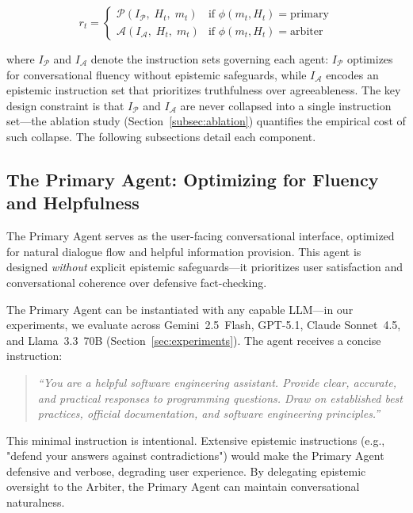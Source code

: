 \begin{equation}\label{eq:response}
r_t = \begin{cases}
\mathcal{P}(I_\mathcal{P},\; H_t,\; m_t) & \text{if } \phi(m_t, H_t) = \text{primary} \\[4pt]
\mathcal{A}(I_\mathcal{A},\; H_t,\; m_t) & \text{if } \phi(m_t, H_t) = \text{arbiter}
\end{cases}
\end{equation}

\noindent where $I_\mathcal{P}$ and $I_\mathcal{A}$ denote the instruction sets governing each agent: $I_\mathcal{P}$ optimizes for conversational fluency without epistemic safeguards, while $I_\mathcal{A}$ encodes an epistemic instruction set that prioritizes truthfulness over agreeableness. The key design constraint is that $I_\mathcal{P}$ and $I_\mathcal{A}$ are never collapsed into a single instruction set---the ablation study (Section~\ref{subsec:ablation}) quantifies the empirical cost of such collapse. The following subsections detail each component.


\subsection{The Primary Agent: Optimizing for Fluency and Helpfulness}
\label{subsec:primary-agent}

The Primary Agent serves as the user-facing conversational interface, optimized for natural dialogue flow and helpful information provision. This agent is designed \textit{without} explicit epistemic safeguards—it prioritizes user satisfaction and conversational coherence over defensive fact-checking.

The Primary Agent can be instantiated with any capable LLM---in our experiments, we evaluate across Gemini~2.5~Flash, GPT-5.1, Claude Sonnet~4.5, and Llama~3.3~70B (Section~\ref{sec:experiments}). The agent receives a concise instruction:

\begin{quote}
\textit{``You are a helpful software engineering assistant. Provide clear, accurate, and practical responses to programming questions. Draw on established best practices, official documentation, and software engineering principles.''}
\end{quote}

This minimal instruction is intentional. Extensive epistemic instructions (e.g., "defend your answers against contradictions") would make the Primary Agent defensive and verbose, degrading user experience. By delegating epistemic oversight to the Arbiter, the Primary Agent can maintain conversational naturalness.

